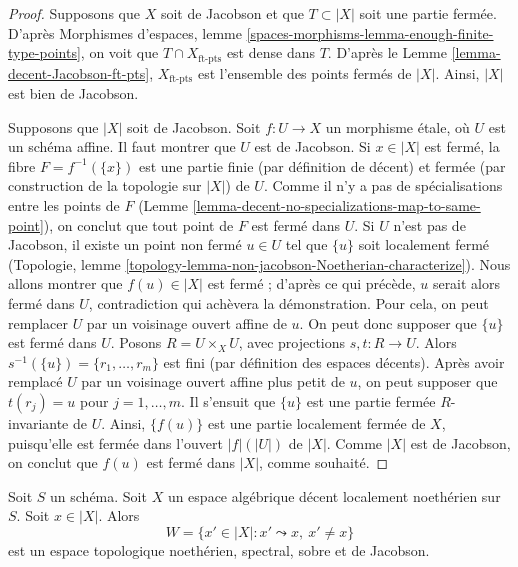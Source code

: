 \begin{proof}
Supposons que $X$ soit de Jacobson et que $T \subset |X|$ soit une partie
fermée. D'après Morphismes d'espaces, lemme
\ref{spaces-morphisms-lemma-enough-finite-type-points}, on voit que
$T \cap X_{\text{ft-pts}}$ est dense dans $T$.
D'après le Lemme \ref{lemma-decent-Jacobson-ft-pts},
$X_{\text{ft-pts}}$ est l'ensemble des points fermés de $|X|$.
Ainsi, $|X|$ est bien de Jacobson.

\medskip\noindent
Supposons que $|X|$ soit de Jacobson. Soit $f : U \to X$ un morphisme étale,
où $U$ est un schéma affine. Il faut montrer que $U$ est de Jacobson.
Si $x \in |X|$ est fermé, la fibre $F = f^{-1}(\{x\})$ est une partie finie
(par définition de décent) et fermée (par construction de la topologie sur
$|X|$) de $U$. Comme il n'y a pas de spécialisations entre les points de $F$
(Lemme \ref{lemma-decent-no-specializations-map-to-same-point}),
on conclut que tout point de $F$ est fermé dans $U$.
Si $U$ n'est pas de Jacobson, il existe un point non fermé $u \in U$ tel que
$\{u\}$ soit localement fermé (Topologie, lemme
\ref{topology-lemma-non-jacobson-Noetherian-characterize}).
Nous allons montrer que $f(u) \in |X|$ est fermé ; d'après ce qui précède,
$u$ serait alors fermé dans $U$, contradiction qui achèvera la démonstration.
Pour cela, on peut remplacer $U$ par un voisinage ouvert affine de $u$.
On peut donc supposer que $\{u\}$ est fermé dans $U$.
Posons $R = U \times_X U$, avec projections $s, t : R \to U$.
Alors $s^{-1}(\{u\}) = \{r_1, \ldots, r_m\}$ est fini
(par définition des espaces décents). Après avoir remplacé $U$ par un
voisinage ouvert affine plus petit de $u$, on peut supposer que
$t(r_j) = u$ pour $j = 1, \ldots, m$. Il s'ensuit que $\{u\}$ est une partie
fermée $R$-invariante de $U$. Ainsi, $\{f(u)\}$ est une partie localement
fermée de $X$, puisqu'elle est fermée dans l'ouvert $|f|(|U|)$ de $|X|$.
Comme $|X|$ est de Jacobson, on conclut que $f(u)$ est fermé dans $|X|$,
comme souhaité.
\end{proof}

\begin{lemma}
\label{lemma-punctured-spec}
Soit $S$ un schéma. Soit $X$ un espace algébrique décent localement
noethérien sur $S$. Soit $x \in |X|$. Alors
$$
W = \{x' \in |X| : x' \leadsto x,\ x' \not = x\}
$$
est un espace topologique noethérien, spectral, sobre et de Jacobson.
\end{lemma}

